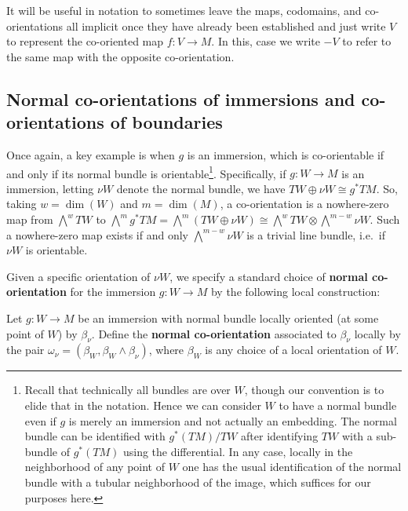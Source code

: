 \begin{notation}\label{N: implicit notation}
	It will be useful in notation to sometimes leave the maps, codomains, and co-orientations all implicit once they have already been established and just write $V$ to represent the co-oriented map $f \colon V \to M$.
	In this, case we write $-V$ to refer to the same map with the opposite co-orientation.
\end{notation}



\subsection{Normal co-orientations of immersions and co-orientations of boundaries}\label{S: normal orientation}

Once again, a key example is when $g$ is an immersion, which is co-orientable if and only if its normal bundle is orientable\footnote{Recall that technically all bundles are over $W$, though our convention is to elide that in the notation.
Hence we can consider $W$ to have a normal bundle even if $g$ is merely an immersion and not actually an embedding.
The normal bundle can be identified with $g^*(TM)/TW$ after identifying $TW$ with a sub-bundle of $g^*(TM)$ using the differential.
In any case, locally in the neighborhood of any point of $W$ one has the usual identification of the normal bundle with a tubular neighborhood of the image, which suffices for our purposes here.}.
Specifically, if $g \colon W \to M$ is an immersion, letting $\nu W$ denote the normal bundle, we have $TW \oplus \nu W \cong g^*TM$.
So, taking $w = \dim(W)$ and $m = \dim(M)$, a co-orientation is a nowhere-zero map from $\bigwedge^w TW$ to $\bigwedge^m g^*TM = \bigwedge^m (TW \oplus \nu W) \cong \bigwedge^w TW \otimes \bigwedge^{m-w}\nu W$.
Such a nowhere-zero map exists if and only $\bigwedge^{m-w}\nu W$ is a trivial line bundle, i.e.\ if $\nu W$ is orientable.

Given a specific orientation of $\nu W$, we specify a standard choice of \textbf{normal co-orientation} for the immersion $g \colon W \to M$ by the following local construction:

\begin{definition}\label{normal co-or}
	Let $g \colon W \to M$ be an immersion with normal bundle locally oriented (at some point of $W$) by $\beta_\nu$.
	Define the \textbf{normal co-orientation} associated to $\beta_\nu$ locally by the pair $\omega_{\nu} = (\beta_W, \beta_W \wedge \beta_\nu)$, where $\beta_W$ is any choice of a local orientation of $W$.
\end{definition}

